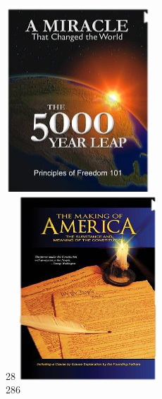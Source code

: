 \begin{frame}
    \begin{columns}[onlytextwidth]
            \centering
            \includegraphics{img/5000-year-leap.png}
            \\ 28
            \pause
            \centering
            \includegraphics{img/making-of-america.png}
            \\ 286
    \end{columns}
\end{frame}

